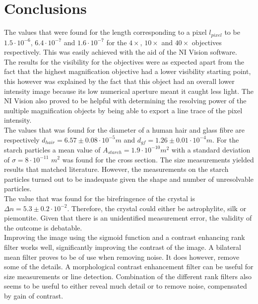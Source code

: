\section{Conclusions}

The values that were found  for the length corresponding to a pixel $l_{pixel}$ to be $1.5\cdot10^{-6}$, $6.4\cdot10^{-7}$ and $1.6\cdot10^{-7}$ for the $4\times$, $10\times$ and $40\times$ objectives respectively. This was easily achieved with the aid of the NI Vision software.\\
The results for the visibility for the objectives were as expected apart from the fact that the highest magnification objective had a lower visibility starting point, this however was explained by the fact that this object had an overall lower intensity image because its low numerical aperture meant it caught less light. The NI Vision also proved to be helpful with determining the resolving power of the multiple magnification objects by being able to export a line trace of the pixel intensity.\\
The values that was found for the diameter of a human hair and glass fibre are respectively $d_{hair}=6.57\pm0.08\cdot10^{-5} m$ and $d_{gf}=1.26\pm0.01\cdot10^{-4} m$. For the starch particles a mean  value of $A_{starch}=1.9\cdot10^{-10} m^2$ with a standard deviation of $\sigma = 8 \cdot10^{-11}$ $m^2$ was found for the cross section. The size measurements yielded results that matched literature. However, the measurements on the starch particles turned out to be inadequate given the shape and number of unresolvable particles.\\
The value that was found for the birefringence of the crystal is $\Delta n = 5.3\pm0.2\cdot10^{-2}$. Therefore, the crystal could either be astrophylite, silk or piemontite. Given that there is an unidentified measurement error, the validity of the outcome is debatable.\\
Improving the image using the sigmoid function and a contrast enhancing rank filter works well, significantly improving the contrast of the image. A bilateral mean filter proves to be of use when removing noise. It does however, remove some of the details. A morphological contrast enhancement filter can be useful for size measurements or line detection. Combination of the different rank filters also seems to be useful to either reveal much detail or to remove noise, compensated by gain of contrast.  \\


